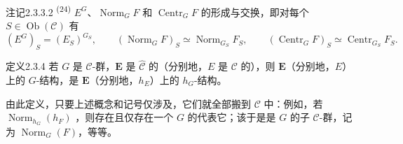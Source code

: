 \begin{SGAresult}{注记}{2.3.3.2}
\textsuperscript{(24)} $E^G$、$\operatorname{Norm}_GF$ 和 $\operatorname{Centr}_GF$ 的形成与交换，即对每个 $S\in\operatorname{Ob}(\mathcal C)$ 有
\[
(E^G)_S=(E_S)^{G_S},\qquad
(\operatorname{Norm}_GF)_S\simeq\operatorname{Norm}_{G_S}F_S,\qquad
(\operatorname{Centr}_GF)_S\simeq\operatorname{Centr}_{G_S}F_S.
\]
\end{SGAresult}
\begin{SGAresult}{定义}{2.3.4}
若 $G$ 是 $\mathcal C$-群，$\mathbf E$ 是 $\widehat{\mathcal C}$ 的（分别地，$E$ 是 $\mathcal C$ 的），则 $\mathbf E$（分别地，$E$）上的 $G$-结构，是 $\mathbf E$（分别地，$h_E$）上的 $h_G$-结构。
\end{SGAresult}
由此定义，只要上述概念和记号仅涉及，它们就全部搬到 $\mathcal C$ 中：例如，若 $\operatorname{Norm}_{h_G}(h_F)$ ，则存在且仅存在一个 $G$ 的代表它；该于是是 $G$ 的子 $\mathcal C$-群，记为 $\operatorname{Norm}_G(F)$，等等。


